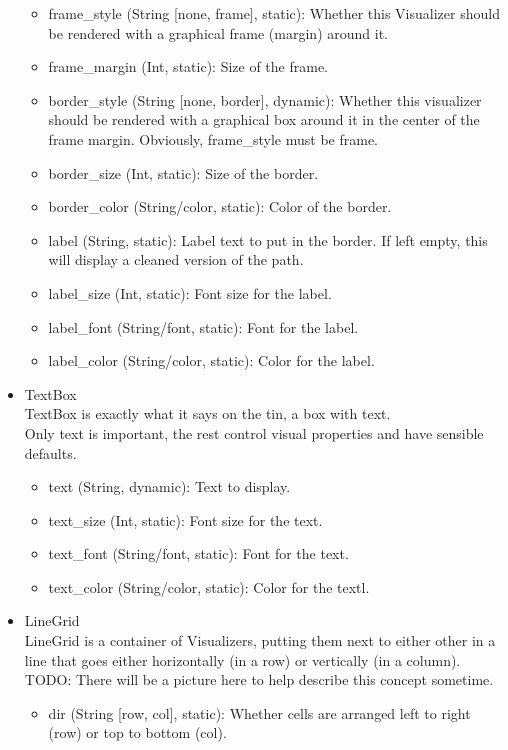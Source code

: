 \documentclass[11pt]{article}
\begin{document}
\begin{itemize}
\begin{itemize}
    \item frame\_style (String [none, frame], static): Whether this Visualizer should be rendered with a graphical frame (margin) around it.
    \item frame\_margin (Int, static): Size of the frame.
    \item border\_style (String [none, border], dynamic): Whether this visualizer should be rendered with a graphical box around it in the center of the frame margin. Obviously, frame\_style must be frame.
    \item border\_size (Int, static): Size of the border.
    \item border\_color (String/color, static): Color of the border.
    \item label (String, static): Label text to put in the border. If left empty, this will display a cleaned version of the path.
    \item label\_size (Int, static): Font size for the label.
    \item label\_font (String/font, static): Font for the label.
    \item label\_color (String/color, static): Color for the label.
  \end{itemize}
  \item TextBox \\
  TextBox is exactly what it says on the tin, a box with text. \\
  Only text is important, the rest control visual properties and have sensible defaults.
  \begin{itemize}
    \item text (String, dynamic): Text to display.
    \item text\_size (Int, static): Font size for the text.
    \item text\_font (String/font, static): Font for the text.
    \item text\_color (String/color, static): Color for the textl.
  \end{itemize}
  \item LineGrid \\
  LineGrid is a container of Visualizers, putting them next to either other in a line that goes either horizontally (in a row) or vertically (in a column). \\
  TODO: There will be a picture here to help describe this concept sometime.
  \begin{itemize}
    \item dir (String [row, col], static): Whether cells are arranged left to right (row) or top to bottom (col).

\end{itemize}
\end{itemize}
\end{document}
